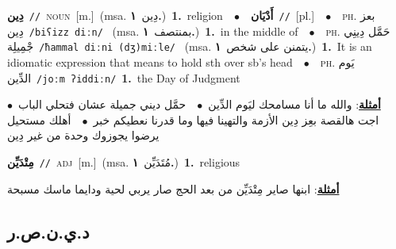 \documentclass[10pt,a4paper,twoside]{article} %
\begin{document}
\begin{multicols}{2}
{\setlength\topsep{0pt}\textbf{\foreignlanguage{arabic}{دِين}}\ {\color{gray}\texttt{//}\color{black}}\ \textsc{noun}\ [m.]\ \color{gray}(msa. \foreignlanguage{arabic}{دِين}~\foreignlanguage{arabic}{\textbf{١.}})\color{black}\ \textbf{1.}~religion\ \ $\bullet$\ \ \setlength\topsep{0pt}\textbf{\foreignlanguage{arabic}{أَدْيَان}}\ {\color{gray}\texttt{//}\color{black}}\ [pl.]\ \ $\bullet$\ \ \textsc{ph.} \color{gray} \foreignlanguage{arabic}{بعز دِين}\color{black}\ {\color{gray}\texttt{/{\sffamily biʕizz diːn}/}\color{black}}\ \color{gray} (msa. \foreignlanguage{arabic}{بمنتصف}~\foreignlanguage{arabic}{\textbf{١.}})\color{black}\ \textbf{1.}~in the middle of\ \ $\bullet$\ \ \textsc{ph.} \color{gray} \foreignlanguage{arabic}{حَمَّل دِينِي جْمِيلِة}\color{black}\ {\color{gray}\texttt{/{\sffamily ħammal diːni (dʒ)miːle}/}\color{black}}\ \color{gray} (msa. \foreignlanguage{arabic}{يتمنن على شخص}~\foreignlanguage{arabic}{\textbf{١.}})\color{black}\ \textbf{1.}~It is an idiomatic expression that means to hold sth over sb's head\ \ $\bullet$\ \ \textsc{ph.} \color{gray} \foreignlanguage{arabic}{يَوم الدِّين}\color{black}\ {\color{gray}\texttt{/{\sffamily joːm ʔiddiːn}/}\color{black}}\ \textbf{1.}~the Day of Judgment\  \begin{flushright}\color{gray}\foreignlanguage{arabic}{\textbf{\underline{\foreignlanguage{arabic}{أمثلة}}}: والله ما أنا مسامحك ليَوم الدِّين\ $\bullet$\ \  حمَّل ديني جميلة عشان فتحلي الباب\ $\bullet$\ \  اجت هالقصة بعِز دِين الأزمة والتهينا فيها وما قدرنا نعطيكم خبر\ $\bullet$\ \  أهلك مستحيل يرضوا يجوزوك وحدة من غير دِين}\end{flushright}\color{black}} \vspace{2mm}

{\setlength\topsep{0pt}\textbf{\foreignlanguage{arabic}{مِتْدَيِّن}}\ {\color{gray}\texttt{//}\color{black}}\ \textsc{adj}\ [m.]\ \color{gray}(msa. \foreignlanguage{arabic}{مُتَدَيِّن}~\foreignlanguage{arabic}{\textbf{١.}})\color{black}\ \textbf{1.}~religious\  \begin{flushright}\color{gray}\foreignlanguage{arabic}{\textbf{\underline{\foreignlanguage{arabic}{أمثلة}}}: ابنها  صاير مِتْدَيِّن من بعد الحج صار يربي لحية ودايما ماسك مسبحة}\end{flushright}\color{black}} \vspace{2mm}

\vspace{-3mm}
\subsection*{\color{blue}\foreignlanguage{arabic}{د.ي.ن.ص.ر}\color{blue}{ (ntws)}} 


\end{multicols}
\end{document}

